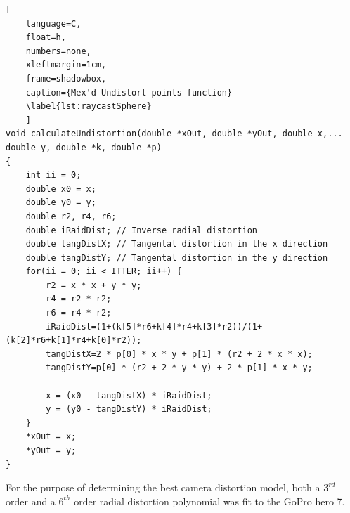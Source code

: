 \documentclass{UoNMCHA}
\numberwithin{equation}{section}
\begin{document}
\begin{lstlisting}[
    language=C,
	float=h,
	numbers=none,
    xleftmargin=1cm,
    frame=shadowbox,
	caption={Mex'd Undistort points function}
	\label{lst:raycastSphere}
	]
void calculateUndistortion(double *xOut, double *yOut, double x,...
double y, double *k, double *p)
{
	int ii = 0;
	double x0 = x;
	double y0 = y;
	double r2, r4, r6;
	double iRaidDist; // Inverse radial distortion
	double tangDistX; // Tangental distortion in the x direction
	double tangDistY; // Tangental distortion in the y direction
	for(ii = 0; ii < ITTER; ii++) {
		r2 = x * x + y * y;
		r4 = r2 * r2;
		r6 = r4 * r2;
		iRaidDist=(1+(k[5]*r6+k[4]*r4+k[3]*r2))/(1+(k[2]*r6+k[1]*r4+k[0]*r2));
		tangDistX=2 * p[0] * x * y + p[1] * (r2 + 2 * x * x);
		tangDistY=p[0] * (r2 + 2 * y * y) + 2 * p[1] * x * y;

		x = (x0 - tangDistX) * iRaidDist;
		y = (y0 - tangDistY) * iRaidDist;
	}
	*xOut = x;
	*yOut = y;
}
\end{lstlisting}

For the purpose of determining the best camera distortion model, both a $3^{rd}$ order and a $6^{th}$ order radial distortion polynomial was fit to the GoPro hero 7.
\end{document}
